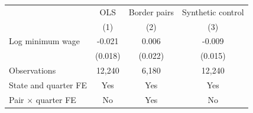 \begin{tabular}{@{}lccc@{}}
\toprule
 & OLS & Border pairs & Synthetic control \\
 & (1) & (2) & (3) \\
\midrule
Log minimum wage & -0.021 & 0.006 & -0.009 \\
 & (0.018) & (0.022) & (0.015) \\
\midrule
Observations & 12,240 & 6,180 & 12,240 \\
State and quarter FE & Yes & Yes & Yes \\
Pair $\times$ quarter FE & No & Yes & No \\
\bottomrule
\end{tabular}
